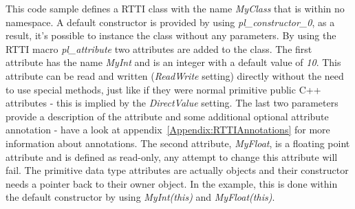 This code sample defines a \ac{RTTI} class with the name \emph{MyClass} that is within no namespace. A default constructor is provided by using \emph{pl\_constructor\_0}, as a result, it's possible to instance the class without any parameters. By using the \ac{RTTI} macro \emph{pl\_attribute} two attributes are added to the class. The first attribute has the name \emph{MyInt} and is an integer with a default value of \emph{10}. This attribute can be read and written (\emph{ReadWrite} setting) directly without the need to use special methods, just like if they were normal primitive public C++ attributes - this is implied by the \emph{DirectValue} setting. The last two parameters provide a description of the attribute and some additional optional attribute annotation - have a look at appendix~\ref{Appendix:RTTIAnnotations} for more information about annotations. The second attribute, \emph{MyFloat}, is a floating point attribute and is defined as read-only, any attempt to change this attribute will fail. The primitive data type attributes are actually objects and their constructor needs a pointer back to their owner object. In the example, this is done within the default constructor by using \emph{MyInt(this)} and \emph{MyFloat(this)}.

